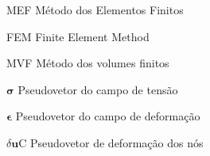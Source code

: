 
\listoffigures*
\cleardoublepage



\listoftables*
\cleardoublepage

\begin{siglas}
	\item[MEF] Método dos Elementos Finitos
	\item[FEM] Finite Element Method 
	\item[MVF] Método dos volumes finitos
\end{siglas}



\begin{simbolos}
  \item[$\mathbf{\sigma}$] Pseudovetor do campo de tensão
  \item[$\mathbf{\epsilon}$] Pseudovetor do campo de deformação
  \item[$\delta\mathbf{u}$C] Pseudovetor de deformação dos nós
\end{simbolos}

